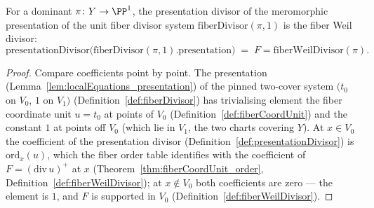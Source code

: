 \begin{theorem}
  \label{thm:presentationDivisor_fiberDivisor_one}
  \leanok
  For a dominant \(\pi \colon Y \to \PP^1\), the presentation divisor of the meromorphic
  presentation of the unit fiber divisor system \(\mathrm{fiberDivisor}(\pi,1)\) is the
  fiber Weil divisor:
  \[
    \mathrm{presentationDivisor}\bigl(\mathrm{fiberDivisor}(\pi,1).\mathrm{presentation}\bigr)
      \;=\; F = \mathrm{fiberWeilDivisor}(\pi) .
  \]
\end{theorem}
\begin{proof}
  \leanok
  Compare coefficients point by point. The presentation
  (Lemma~\ref{lem:localEquations_presentation}) of the pinned two-cover system \((t_0\)
  on \(V_0\), \(1\) on \(V_1)\) (Definition~\ref{def:fiberDivisor}) has trivialising
  element the fiber coordinate unit \(u = t_0\) at points of \(V_0\)
  (Definition~\ref{def:fiberCoordUnit}) and the constant \(1\) at points off \(V_0\)
  (which lie in \(V_1\), the two charts covering \(Y\)). At \(x \in V_0\) the coefficient
  of the presentation divisor (Definition~\ref{def:presentationDivisor}) is
  \(\mathrm{ord}_x(u)\), which the fiber order table identifies with the coefficient of
  \(F = (\mathrm{div}\,u)^{+}\) at \(x\) (Theorem~\ref{thm:fiberCoordUnit_order},
  Definition~\ref{def:fiberWeilDivisor}); at \(x \notin V_0\) both coefficients are zero —
  the element is \(1\), and \(F\) is supported in \(V_0\)
  (Definition~\ref{def:fiberWeilDivisor}).
\end{proof}

